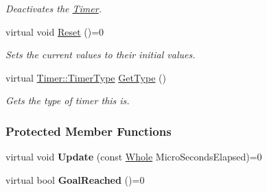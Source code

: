 \begin{DoxyCompactItemize}
\begin{DoxyCompactList}\small\item\em Deactivates the \hyperlink{classphys_1_1Timer}{Timer}. \item\end{DoxyCompactList}\item 
\hypertarget{classphys_1_1Timer_a6010a6dab70b542c3e9d5a09caa422f7}{
virtual void \hyperlink{classphys_1_1Timer_a6010a6dab70b542c3e9d5a09caa422f7}{Reset} ()=0}
\label{d3/d83/classphys_1_1Timer_a6010a6dab70b542c3e9d5a09caa422f7}

\begin{DoxyCompactList}\small\item\em Sets the current values to their initial values. \item\end{DoxyCompactList}\item 
virtual \hyperlink{classphys_1_1Timer_aacbbca9cc5543fc8414de59cd085c1c1}{Timer::TimerType} \hyperlink{classphys_1_1Timer_af0eaa87bf3074047db36ba1c6fd33c70}{GetType} ()
\begin{DoxyCompactList}\small\item\em Gets the type of timer this is. \item\end{DoxyCompactList}\end{DoxyCompactItemize}
\subsubsection*{Protected Member Functions}
\begin{DoxyCompactItemize}
\item 
\hypertarget{classphys_1_1Timer_a45d7e290f9cb8c03f2376e48ff794f24}{
virtual void {\bfseries Update} (const \hyperlink{namespacephys_a460f6bc24c8dd347b05e0366ae34f34a}{Whole} MicroSecondsElapsed)=0}
\label{d3/d83/classphys_1_1Timer_a45d7e290f9cb8c03f2376e48ff794f24}

\item 
\hypertarget{classphys_1_1Timer_a636d546064abe43b1c549efaca777613}{
virtual bool {\bfseries GoalReached} ()=0}
\label{d3/d83/classphys_1_1Timer_a636d546064abe43b1c549efaca777613}

\end{DoxyCompactItemize}
